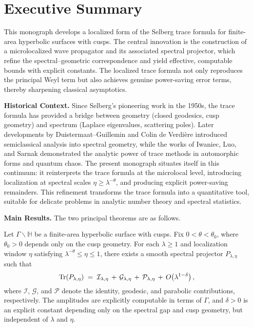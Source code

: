 \section*{Executive Summary}

This monograph develops a localized form of the Selberg trace formula for
finite-area hyperbolic surfaces with cusps. The central innovation is the
construction of a microlocalized wave propagator and its associated spectral
projector, which refine the spectral–geometric correspondence and yield
effective, computable bounds with explicit constants. The localized trace
formula not only reproduces the principal Weyl term but also achieves genuine
power-saving error terms, thereby sharpening classical asymptotics.

\medskip
\noindent\textbf{Historical Context.}
Since Selberg's pioneering work in the 1950s, the trace formula has provided a
bridge between geometry (closed geodesics, cusp geometry) and spectrum
(Laplace eigenvalues, scattering poles). Later developments by
Duistermaat–Guillemin \cite{DG1975} and Colin de Verdière \cite{CdV1980}
introduced semiclassical analysis into spectral geometry, while the works of
Iwaniec, Luo, and Sarnak \cite{IwaniecSarnak1995, LuoSarnak1995} demonstrated
the analytic power of trace methods in automorphic forms and quantum chaos.
The present monograph situates itself in this continuum: it reinterprets the
trace formula at the microlocal level, introducing localization at spectral
scales $\eta \geq \lambda^{-\theta}$, and producing explicit power-saving
remainders. This refinement transforms the trace formula into a quantitative
tool, suitable for delicate problems in analytic number theory and spectral
statistics.

\medskip
\noindent\textbf{Main Results.} The two principal theorems are as follows.

\begin{theorem}\label{thm:localized-trace}
Let $\Gamma \backslash \mathbb{H}$ be a finite-area hyperbolic surface with
cusps. Fix $0<\theta<\theta_0$, where $\theta_0>0$ depends only on the cusp
geometry. For each $\lambda \geq 1$ and localization window $\eta$ satisfying
$\lambda^{-\theta}\leq \eta \leq 1$, there exists a smooth spectral projector
$P_{\lambda,\eta}$ such that
\[
  \operatorname{Tr}(P_{\lambda,\eta})
  \;=\;
  \mathcal{I}_{\lambda,\eta} \,+\,
  \mathcal{G}_{\lambda,\eta} \,+\,
  \mathcal{P}_{\lambda,\eta}
  \,+\, O\!\left(\lambda^{1-\delta}\right),
\]
where $\mathcal{I}$, $\mathcal{G}$, and $\mathcal{P}$ denote the identity,
geodesic, and parabolic contributions, respectively. The amplitudes are
explicitly computable in terms of $\Gamma$, and $\delta>0$ is an explicit
constant depending only on the spectral gap and cusp geometry, but independent
of $\lambda$ and $\eta$.
\end{theorem}

